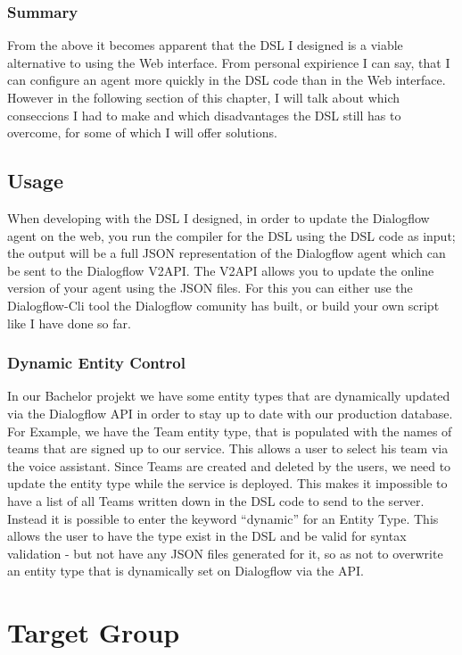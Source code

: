 \subsubsection{Summary}
From the above it becomes apparent that the DSL I designed is a viable alternative to using the Web interface.
From personal expirience I can say, that I can configure an agent more quickly in the DSL code than in the Web interface. However in the following section of this chapter, I will talk about which conseccions I had to make and which disadvantages the DSL still has to overcome, for some of which I will offer solutions.

\subsection{Usage}

When developing with the DSL I designed, in order to update the Dialogflow agent on the web, you run the compiler for the DSL using the DSL code as input; the output will be a full JSON representation of the Dialogflow agent which can be sent to the Dialogflow V2API.
The V2API allows you to update the online version of your agent using the JSON files. For this you can either use the Dialogflow-Cli tool \cite{Charles2018} the Dialogflow comunity has built, or build your own script like I have done so far.

\subsubsection{Dynamic Entity Control}

In our Bachelor projekt we have some entity types that are dynamically updated via the Dialogflow API in order to stay up to date with our production database. For Example, we have the Team entity type, that is populated with the names of teams that are signed up to our service. This allows a user to select his team via the voice assistant.
Since Teams are created and deleted by the users, we need to update the entity type while the service is deployed.
This makes it impossible to have a list of all Teams written down in the DSL code to send to the server. 
Instead it is possible to enter the keyword “dynamic” for an Entity Type.
This allows the user to have the type exist in the DSL and be valid for syntax validation - but not have any JSON files generated for it, so as not to overwrite an entity type that is dynamically set on Dialogflow via the API.

\section{Target Group}


